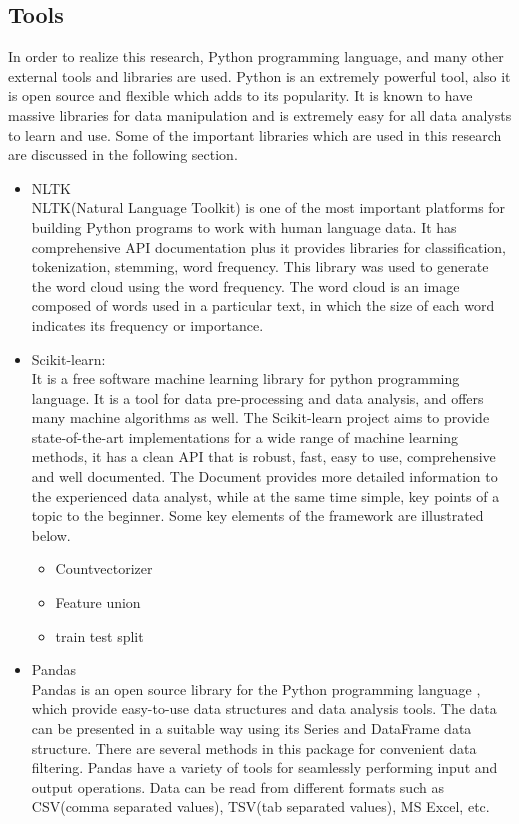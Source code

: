 \subsection{Tools}
In order to realize this research, Python programming language, and many other external tools and libraries are used. Python is an extremely powerful tool, also it is open source and flexible which adds to its popularity. It is known to have massive libraries for data manipulation and is extremely easy for all data analysts to learn and use. Some of the important libraries which are used in this research are discussed in the following section.  


\begin{itemize}
    \item NLTK \\
    NLTK(Natural Language Toolkit) is one of the most important platforms for building Python programs to work with human language data. It has comprehensive API documentation plus it provides libraries for classification, tokenization, stemming, word frequency. This library was used to generate the word cloud using the word frequency. The word cloud is an image composed of words used in a particular text, in which the size of each word indicates its frequency or importance.
    
  
    \item Scikit-learn: \\
    It  \cite{scikit-learn} is a free software machine learning library for python programming language. It is a tool for data pre-processing and data analysis, and offers many machine algorithms as well. The Scikit-learn project aims to provide state-of-the-art implementations for a wide range of machine learning methods, it has a clean API that is robust, fast, easy to use, comprehensive and well documented. The Document provides more detailed information to the experienced data analyst, while at the same time simple, key points of a topic to the beginner. Some key elements of the framework are illustrated below.
    
    \begin{itemize}
        \item Countvectorizer
        \item Feature union
        \item train test split
    \end{itemize}
    
    
 
    
    \item Pandas \\
   Pandas \cite{pythonpandas} is an open source library for the Python programming language , which provide easy-to-use data structures and data analysis tools. The data can be presented in a suitable way using its Series and DataFrame data structure.
  There are several methods in this package for convenient data filtering. Pandas have a variety of tools for seamlessly performing input and output operations. Data can be read from different formats such as CSV(comma separated values), TSV(tab separated values), MS Excel, etc.



\end{itemize}
